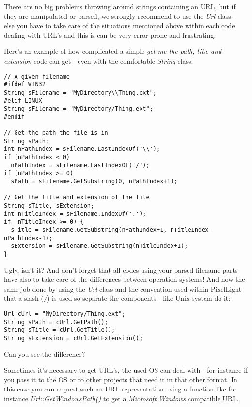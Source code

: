 There are no big problems throwing around strings containing an URL, but if they are manipulated or parsed, we strongly recommend to use the \emph{Url}-class - else you have to take care of the situations mentioned above within each code dealing with URL's and this is can be very error prone and frustrating.

Here's an example of how complicated a simple \emph{get me the path, title and extension}-code can get - even with the comfortable \emph{String}-class:

\begin{lstlisting}[caption=File path\, title and extension without using the Url-class]
// A given filename
#ifdef WIN32
String sFilename = "MyDirectory\\Thing.ext";
#elif LINUX
String sFilename = "MyDirectory/Thing.ext";
#endif

// Get the path the file is in
String sPath;
int nPathIndex = sFilename.LastIndexOf('\\');
if (nPathIndex < 0)
  nPathIndex = sFilename.LastIndexOf('/');
if (nPathIndex >= 0)
  sPath = sFilename.GetSubstring(0, nPathIndex+1);

// Get the title and extension of the file
String sTitle, sExtension;
int nTitleIndex = sFilename.IndexOf('.');
if (nTitleIndex >= 0) {
  sTitle = sFilename.GetSubstring(nPathIndex+1, nTitleIndex-nPathIndex-1);
  sExtension = sFilename.GetSubstring(nTitleIndex+1);
}
\end{lstlisting}

Ugly, isn't it? And don't forget that all codes using your parsed filename parts have also to take care of the differences between operation systems! And now the same job done by using the \emph{Url}-class and the convention used within PixelLight that a slash (\emph{/}) is used so separate the components - like Unix system do it:

\begin{lstlisting}[caption=File path\, title and extension using the Url class]
Url cUrl = "MyDirectory/Thing.ext";
String sPath = cUrl.GetPath();
String sTitle = cUrl.GetTitle();
String sExtension = cUrl.GetExtension();
\end{lstlisting}

Can you see the difference?

Sometimes it's necessary to get URL's, the used OS can deal with - for instance if you pass it to the OS or to other projects that need it in that other format. In this case you can request such an URL representation using a function like for instance \emph{Url::GetWindowsPath()} to get a \emph{Microsoft Windows} compatible URL.

